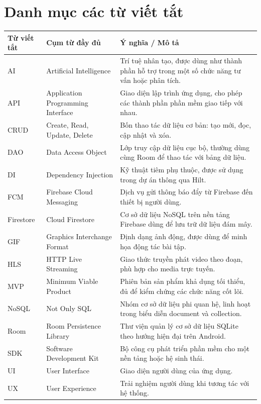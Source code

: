 ﻿\chapter*{Danh mục các từ viết tắt}

\small
\begin{center}
\begin{tabular}{|p{1.8cm}|p{4.2cm}|p{6.2cm}|}
\hline
\textbf{Từ viết tắt} & \textbf{Cụm từ đầy đủ} & \textbf{Ý nghĩa / Mô tả} \\ \hline
AI & Artificial Intelligence & Trí tuệ nhân tạo, được dùng như thành phần hỗ trợ trong một số chức năng tư vấn hoặc phân tích. \\ \hline
API & Application Programming Interface & Giao diện lập trình ứng dụng, cho phép các thành phần phần mềm giao tiếp với nhau. \\ \hline
CRUD & Create, Read, Update, Delete & Bốn thao tác dữ liệu cơ bản: tạo mới, đọc, cập nhật và xóa. \\ \hline
DAO & Data Access Object & Lớp truy cập dữ liệu cục bộ, thường dùng cùng Room để thao tác với bảng dữ liệu. \\ \hline
DI & Dependency Injection & Kỹ thuật tiêm phụ thuộc, được sử dụng trong dự án thông qua Hilt. \\ \hline
FCM & Firebase Cloud Messaging & Dịch vụ gửi thông báo đẩy từ Firebase đến thiết bị người dùng. \\ \hline
Firestore & Cloud Firestore & Cơ sở dữ liệu NoSQL trên nền tảng Firebase dùng để lưu trữ dữ liệu đám mây. \\ \hline
GIF & Graphics Interchange Format & Định dạng ảnh động, được dùng để minh họa động tác bài tập. \\ \hline
HLS & HTTP Live Streaming & Giao thức truyền phát video theo đoạn, phù hợp cho media trực tuyến. \\ \hline
MVP & Minimum Viable Product & Phiên bản sản phẩm khả dụng tối thiểu, đủ để kiểm chứng các chức năng cốt lõi. \\ \hline
NoSQL & Not Only SQL & Nhóm cơ sở dữ liệu phi quan hệ, linh hoạt trong biểu diễn document và collection. \\ \hline
Room & Room Persistence Library & Thư viện quản lý cơ sở dữ liệu SQLite theo hướng hiện đại trên Android. \\ \hline
SDK & Software Development Kit & Bộ công cụ phát triển phần mềm cho một nền tảng hoặc hệ sinh thái. \\ \hline
UI & User Interface & Giao diện người dùng của ứng dụng. \\ \hline
UX & User Experience & Trải nghiệm người dùng khi tương tác với hệ thống. \\ \hline
\end{tabular}
\end{center}
\normalsize
